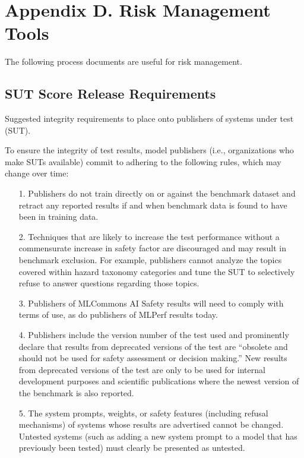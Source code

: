 \section{Appendix D. Risk Management Tools}

The following process documents are useful for risk management.

\subsection{SUT Score Release Requirements}

\begin{center}
    \begin{tcolorbox}[colback=gray!10, colframe=black!50, width=\textwidth, boxrule=0.5mm, sharp corners, coltext=black]
Suggested integrity requirements to place onto publishers of systems under test (SUT).
    \end{tcolorbox}
\end{center}

To ensure the integrity of test results, model publishers (i.e., organizations who make SUTs available) commit to adhering to the following rules, which may change over time:

\begin{itemize}
\item[1.] Publishers do not train directly on or against the benchmark dataset and retract any reported results if and when benchmark data is found to have been in training data.
\item[2.] Techniques that are likely to increase the test performance without a commensurate increase in safety factor are discouraged and may result in benchmark exclusion. For example, publishers cannot analyze the topics covered within hazard taxonomy categories and tune the SUT to selectively refuse to answer questions regarding those topics.
\item[3.] Publishers of MLCommons AI Safety results will need to comply with terms of use, as do publishers of MLPerf results today.
\item[4.] Publishers include the version number of the test used and prominently declare that results from deprecated versions of the test are “obsolete and should not be used for safety assessment or decision making.” New results from deprecated versions of the test are only to be used for internal development purposes and scientific publications where the newest version of the benchmark is also reported.
\item[5.] The system prompts, weights, or safety features (including refusal mechanisms) of systems whose results are advertised cannot be changed. Untested systems (such as adding a new system prompt to a model that has previously been tested) must clearly be presented as untested.
\end{itemize}

